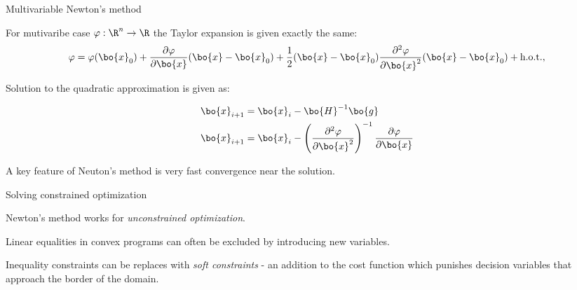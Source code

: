 \documentclass{beamer}
\begin{document}
\begin{frame}{Multivariable Newton's method}
	\begin{flushleft}
		
		For mutivaribe case $\varphi: \R^n \rightarrow \R$ the Taylor expansion is given exactly the same:
		\begin{equation}
			\varphi = \varphi(\bo{x}_0) + \frac{\partial \varphi}{\partial \bo{x}} (\bo{x} - \bo{x}_0)
			+ \frac{1}{2} (\bo{x} - \bo{x}_0) \frac{\partial^2 \varphi}{\partial \bo{x}^2} (\bo{x} - \bo{x}_0)
			+ \text{h.o.t.},
		\end{equation}
		
		Solution to the quadratic approximation is given as:
		
		\begin{align}
			\bo{x}_{i+1} &= \bo{x}_i  - \bo{H}^{-1} \bo{g}
			\\
			\bo{x}_{i+1} &= \bo{x}_i  - \left(\frac{\partial^2 \varphi}{\partial \bo{x}^2} \right)^{-1} 
													 \frac{\partial \varphi}{\partial \bo{x}} 
		\end{align}
		
		A key feature of Neuton's method is very fast convergence near the solution.
		
	\end{flushleft}
\end{frame}






\begin{frame}{Solving constrained optimization}
	\begin{flushleft}
		
		Newton's method works for \emph{unconstrained optimization}.
		
		\bigskip
		
		Linear equalities in convex programs can often be excluded by introducing new variables.
		
		\bigskip
		
		Inequality constraints can be replaces with \emph{soft constraints} - an addition to the cost function which punishes decision variables that approach the border of the domain. 
		
	\end{flushleft}
\end{frame}
\end{document}
